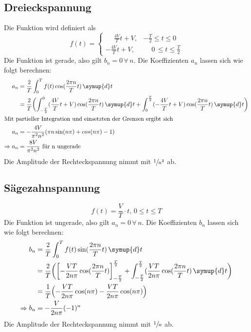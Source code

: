 \subsection{Dreieckspannung}
Die Funktion wird definiert als
\begin{equation*}
    f(t) =
    \begin{cases}
        \phantom{-}\frac{4V}{T}t + V, & -\frac{T}{2}   \leq t \leq 0 \\
        -\frac{4V}{T}t + V,           & \phantom{-} 0\,\leq t \leq \frac{T}{2}
    \end{cases}
\end{equation*}
Die Funktion ist gerade, also gilt $b_n = 0  \, \forall \, n$.
Die Koeffizienten $a_n$ lassen sich wie folgt berechnen:
\begin{align*}
    a_n &= \frac{2}{T} \int_0^T f(t) \cos(\frac{2 \pi n}{T}t) \, \symup{d}t \\
        &= \frac{2}{T} \biggl( \int_{-\frac{T}{2}}^0 (\frac{4V}{T}t + V) \cos(\frac{2 \pi n}{T}t) \, \symup{d}t
                            + \int_{0}^{\frac{T}{2}} (-\frac{4V}{T}t + V) \cos(\frac{2 \pi n}{T}t) \, \symup{d}t \biggr) \\
    \intertext{Mit partieller Integration und einsetzten der Grenzen ergibt sich}
    a_n &= -\frac{4V}{\pi^2 n^2} (\pi n \sin(n \pi)+ cos(n \pi) - 1)\\
    \Rightarrow a_n &= \frac{8V}{\pi^2 n^2} \text{ für n ungerade}
\end{align*}
Die Amplitude der Rechteckspannung nimmt mit $\sfrac{1}{n^2}$ ab.
\subsection{Sägezahnspannung}
\begin{equation*}
    f(t) = \frac{V}{T} \cdot t, \, 0 \leq t \leq T
\end{equation*}
Die Funktion ist ungerade, also gilt $a_n = 0  \, \forall \, n$.
Die Koeffizienten $b_n$ lassen sich wie folgt berechnen:
\begin{align*}
    b_n &= \frac{2}{T} \int_0^T f(t) \sin(\frac{2 \pi n}{T}t) \, \symup{d}t \\
        &= \frac{2}{T} \biggl(\left[-\frac{VT}{2n\pi} \cos(\frac{2 \pi n}{T}t) \right]_{-\frac{T}{2}}^{\frac{T}{2}}
                    + \int_{-\frac{T}{2}}^{\frac{T}{2}} (\frac{VT}{2n\pi} \cos(\frac{2 \pi n}{T}t) \, \symup{d}t \biggr) \\
        &= \frac{1}{T} \Bigl( - \frac{VT}{2n\pi} \cos(n \pi) - \frac{VT}{2n\pi}\cos(n\pi)\Bigr) \\
    \Rightarrow b_n &= -\frac{V}{2n\pi} (-1)^n
\end{align*}
Die Amplitude der Rechteckspannung nimmt mit $\sfrac{1}{n}$ ab.